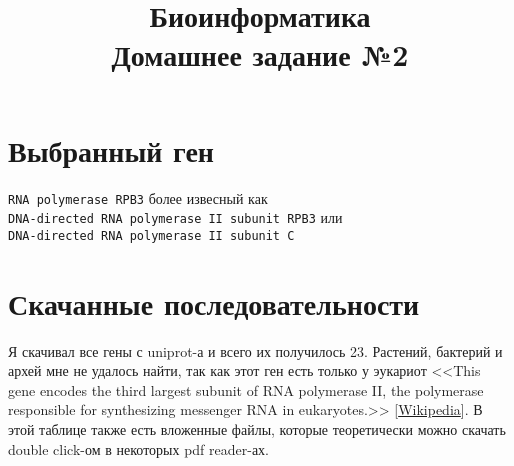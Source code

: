 \documentclass{article}
\title{Биоинформатика \\ Домашнее задание №2}
\begin{document}
  \maketitle

  \section{Выбранный ген}
  \texttt{RNA polymerase RPB3} более извесный как \\
  \texttt{DNA-directed RNA polymerase II subunit RPB3} или \\
  \texttt{DNA-directed RNA polymerase II subunit С}

  \section{Скачанные последовательности}
  Я скачивал все гены с uniprot-а и всего их получилось 23.
  Растений, бактерий и архей мне не удалось найти, так как этот ген есть только у эукариот
  <<This gene encodes the third largest subunit of RNA polymerase II, the polymerase responsible for synthesizing messenger RNA in eukaryotes.>>
  [\href{https://en.wikipedia.org/wiki/POLR2C}{Wikipedia}].
  В этой таблице также есть вложенные файлы, которые теоретически можно скачать double click-ом в некоторых pdf reader-ах.
\end{document}
